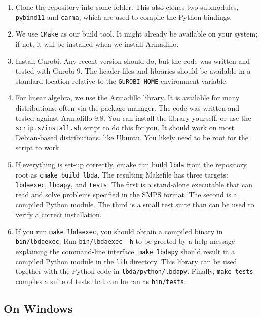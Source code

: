 \documentclass[12pt, english]{article}
\begin{document}
\begin{enumerate}
	\item Clone the repository into some folder. This also clones two submodules, \texttt{pybind11} and \texttt{carma}, which are used to compile the Python bindings.
	
	\item We use \texttt{CMake} as our build tool. It might already be available on your system; if not, it will be installed when we install Armadillo.
	
	\item Install Gurobi. Any recent version should do, but the code was written and tested with Gurobi 9. The header files and libraries should be available in a standard location relative to the \texttt{GUROBI\_HOME} environment variable.
	
	\item For linear algebra, we use the Armadillo library. It is available for many distributions, often via the package manager. The code was written and tested against Armadillo 9.8. You can install the library yourself, or use the \texttt{scripts/install.sh} script to do this for you. It should work on most Debian-based distributions, like Ubuntu. You likely need to be root for the script to work.
	
	\item If everything is set-up correctly, cmake can build \texttt{lbda} from the repository root as \texttt{cmake build lbda}. The resulting Makefile has three targets: \texttt{lbdaexec}, \texttt{lbdapy}, and \texttt{tests}. The first is a stand-alone executable that can read and solve problems specified in the SMPS format. The second is a compiled Python module. The third is a small test suite than can be used to verify a correct installation.
	
	\item If you run \texttt{make lbdaexec}, you should obtain a compiled binary in \texttt{bin/lbdaexec}. Run \texttt{bin/lbdaexec -h} to be greeted by a help message explaining the command-line interface. \texttt{make lbdapy} should result in a compiled Python module in the \texttt{lib} directory. This library can be used together with the Python code in \texttt{lbda/python/lbdapy}. Finally, \texttt{make tests} compiles a suite of tests that can be ran as \texttt{bin/tests}.
\end{enumerate}

\subsection{On Windows}
\end{document}
